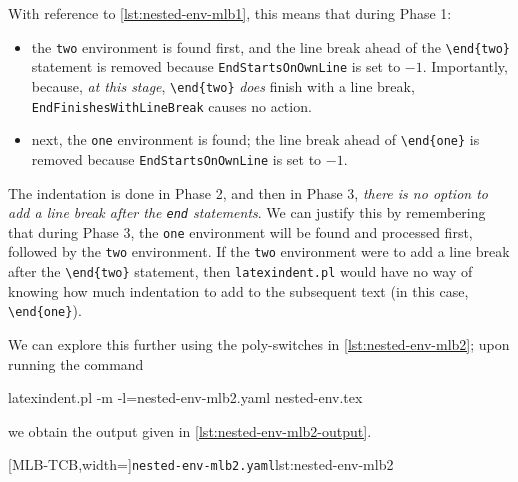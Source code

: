 	With reference to \cref{lst:nested-env-mlb1}, this means that during Phase 1:
	\begin{itemize}
		\item the \texttt{two} environment is found first, and
		      the line break ahead of the \lstinline!\end{two}! statement is removed because \texttt{EndStartsOnOwnLine} is set to $-1$. Importantly,
		      because, \emph{at this stage}, \lstinline!\end{two}! \emph{does} finish with a line break, \texttt{EndFinishesWithLineBreak} causes
		      no action.
		\item next, the \texttt{one} environment is found; the line break ahead of \lstinline!\end{one}! is removed because \texttt{EndStartsOnOwnLine}
		      is set to $-1$.
	\end{itemize}
	The indentation is done in Phase 2, and then in Phase 3, \emph{there is no option to add a line break after the \lstinline!end! statements}.
	We can justify this by remembering that during Phase 3, the \texttt{one} environment will be found and processed first, followed
	by the \texttt{two} environment. If the \texttt{two} environment were to add a line break after the \lstinline!\end{two}! statement, then
	\texttt{latexindent.pl} would have no way of knowing how much indentation to add to the subsequent text (in this case, \lstinline!\end{one}!).

	We can explore this further using the poly-switches in \cref{lst:nested-env-mlb2}; upon running the command
	\begin{commandshell}
latexindent.pl -m -l=nested-env-mlb2.yaml nested-env.tex
        \end{commandshell}
	we obtain the output given in \cref{lst:nested-env-mlb2-output}.

	\begin{minipage}{.45\linewidth}
	\end{minipage}
	\hfill
	\begin{minipage}{.55\linewidth}
		[MLB-TCB,width=\linewidth]{\texttt{nested-env-mlb2.yaml}}{lst:nested-env-mlb2}
	\end{minipage}

